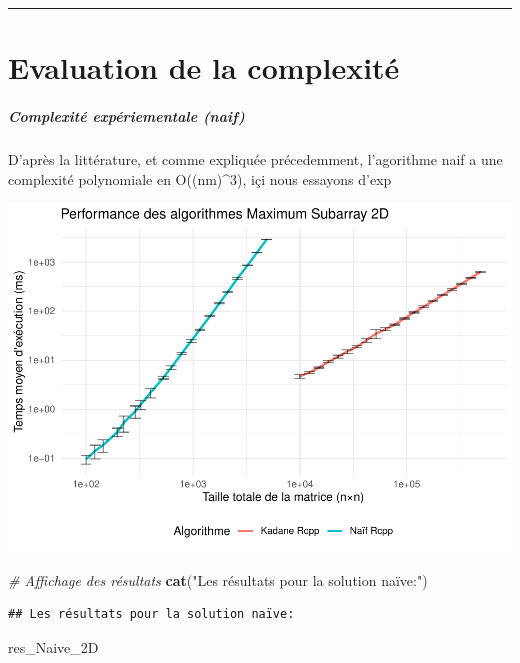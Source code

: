\documentclass[
]{article}
\newenvironment{Shaded}{\begin{snugshade}}{\end{snugshade}}
\newcommand{\CommentTok}[1]{\textcolor[rgb]{0.56,0.35,0.01}{\textit{#1}}}
\newcommand{\FunctionTok}[1]{\textcolor[rgb]{0.13,0.29,0.53}{\textbf{#1}}}
\newcommand{\NormalTok}[1]{#1}
\newcommand{\StringTok}[1]{\textcolor[rgb]{0.31,0.60,0.02}{#1}}
\begin{document}
\begin{center}\rule{0.5\linewidth}{0.5pt}\end{center}

\section{Evaluation de la
complexité}\label{evaluation-de-la-complexituxe9}

\subparagraph{Complexité expériementale
(naif)}\label{complexituxe9-expuxe9riementale-naif}

D'après la littérature, et comme expliquée précedemment, l'agorithme
naif a une complexité polynomiale en O((nm)\^{}3), içi nous essayons
d'exp

\includegraphics{MaxSubarray2D_files/figure-latex/simu complexite-1.pdf}

\begin{Shaded}
\begin{Highlighting}[]
\CommentTok{\# Affichage des résultats}
\FunctionTok{cat}\NormalTok{(}\StringTok{"Les résultats pour la solution naïve:"}\NormalTok{)}
\end{Highlighting}
\end{Shaded}

\begin{verbatim}
## Les résultats pour la solution naïve:
\end{verbatim}

\begin{Shaded}
\begin{Highlighting}[]
\NormalTok{res\_Naive\_2D}
\end{Highlighting}
\end{Shaded}
\end{document}
